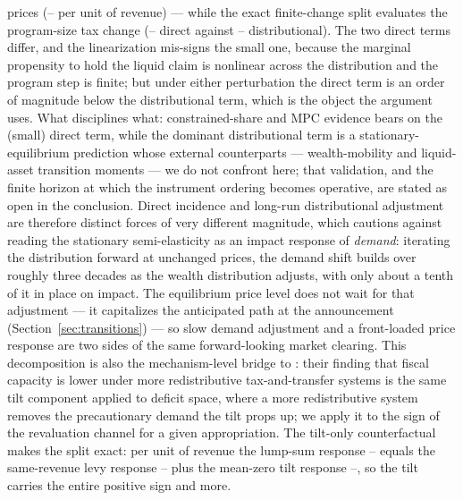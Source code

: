 \documentclass[12pt]{article}
\providecommand{\pendingnum}{\textit{--}}
\providecommand{\epsLsPerRev}{\pendingnum}\providecommand{\epsLevyPerRev}{\pendingnum}
\providecommand{\epsTilt}{\pendingnum}
\providecommand{\covTiltDirect}{\pendingnum}\providecommand{\covTiltShift}{\pendingnum}
\providecommand{\covPolExact}{\pendingnum}\providecommand{\covDistExact}{\pendingnum}
\begin{document}
prices ($\covTiltDirect$ per unit of revenue) --- while the exact
finite-change split evaluates the program-size tax change ($\covPolExact$
direct against $\covDistExact$ distributional). The two direct terms
differ, and the linearization mis-signs the small one, because the
marginal propensity to hold the liquid claim is nonlinear across the
distribution and the program step is finite; but under either
perturbation the direct term is an order of magnitude below the
distributional term, which is the object the argument uses. What disciplines what: constrained-share and MPC evidence
bears on the (small) direct term, while the dominant distributional term
is a stationary-equilibrium prediction whose external counterparts ---
wealth-mobility and liquid-asset transition moments --- we do not
confront here; that validation, and the finite horizon at which the
instrument ordering becomes operative, are stated as open in the
conclusion. Direct
incidence and long-run distributional adjustment are therefore distinct
forces of very different magnitude, which cautions against reading the
stationary semi-elasticity as an impact response of \emph{demand}: iterating
the distribution forward at unchanged prices, the demand shift builds over
roughly three decades as the wealth distribution adjusts, with only about a
tenth of it in place on impact. The equilibrium price level does not wait
for that adjustment --- it capitalizes the anticipated path at the
announcement (Section~\ref{sec:transitions}) --- so slow demand adjustment
and a front-loaded price response are two sides of the same forward-looking
market clearing. This decomposition is also the
mechanism-level bridge to \citet{kaplannikolakoudisviolante2023}: their
finding that fiscal capacity is lower under more redistributive
tax-and-transfer systems is the same tilt component applied to deficit
space, where a more redistributive system removes the precautionary demand
the tilt props up; we apply it to the sign of the revaluation channel for a
given appropriation. The tilt-only counterfactual makes the split exact: per
unit of revenue the lump-sum response $\epsLsPerRev$ equals the
same-revenue levy response $\epsLevyPerRev$ plus the mean-zero tilt response
$\epsTilt$, so the tilt carries the entire positive sign and more.
\end{document}
